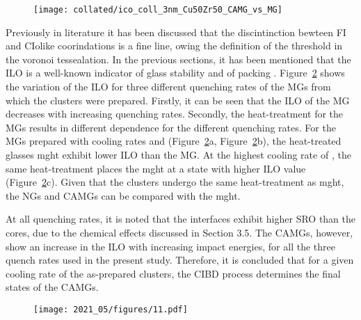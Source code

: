 \begin{figure} %
	\texttt{[image: collated/ico\_coll\_3nm\_Cu50Zr50\_CAMG\_vs\_MG]}
	\label{f:camg_fi}
\end{figure}

\begin{selfcite}
Previously in literature \cite{Ding2014} it has been discussed that the discintinction bewteen FI and CIolike coorindations is a fine line, owing the definition of the threshold in the voronoi tessealation. In the previous sections, it has been mentioned that the ILO is a well-known indicator of glass stability and of packing \cite{Ding2014,Ding2014a,Adelman1976}. Figure~\ref{f:camg_ilo} shows the variation of the ILO for three different quenching rates of the MGs from which the clusters were prepared. Firstly, it can be seen that the ILO of the MG decreases with increasing quenching rates. Secondly, the heat-treatment for the MGs results in different dependence for the different quenching rates. For the MGs prepared with cooling rates  and  (Figure~\ref{f:camg_ilo}a, Figure~\ref{f:camg_ilo}b), the heat-treated glasses \gls{mght} exhibit lower ILO than the MG. At the highest cooling rate of , the same heat-treatment places the \gls{mght} at a state with higher ILO value (Figure~\ref{f:camg_ilo}c). Given that the clusters undergo the same heat-treatment as \gls{mght}, the NGs and CAMGs can be compared with the \gls{mght}. \par

At all quenching rates, it is noted that the interfaces exhibit higher SRO than the cores, due to the chemical effects discussed in Section 3.5. The CAMGs, however, show an increase in the ILO with increasing impact energies, for all the three quench rates used in the present study. Therefore, it is concluded that for a given cooling rate of the as-prepared clusters, the CIBD process determines the final states of the CAMGs. \par

\begin{figure} %
	\texttt{[image: 2021\_05/figures/11.pdf]}
	\label{f:camg_ilo}
\end{figure}


\end{selfcite}
